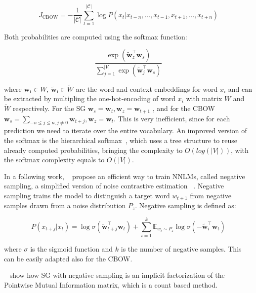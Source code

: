 \begin{equation}
J_{\mathrm{CBOW}}=-\frac{1}{|\mathcal{C}|} \sum_{t=1}^{|\mathcal{C}|} \log P\left(x_{t} | x_{t-n}, \dots, x_{t-1}, x_{t+1}, \dots, x_{t+n}\right)
\end{equation}

Both probabilities are computed using the softmax function:

\begin{equation}
\frac{\exp \left(\tilde{\mathbf{w}}_{z}^{\top} \mathbf{w}_{s}\right)}{\sum_{j=1}^{|V|} \exp \left(\tilde{\mathbf{w}}_{j}^{\top} \mathbf{w}_{s}\right)}
\end{equation}

where $\mathbf{w_i} \in W$, $\mathbf{\tilde{w}_i} \in \tilde{W}$ are the word and context embeddings for word $x_i$ and can be extracted by multipling the one-hot-encoding of word $x_i$ with matrix $W$ and $\tilde{W}$ respectively. For the SG $\mathbf{w}_s = \mathbf{w}_t, \mathbf{w}_z = \mathbf{w}_{t+1}$ , and for the CBOW $\mathbf{w}_s = \sum_{-n \leq j \leq n, j \neq 0} \mathbf{w}_{t+j}, \mathbf{w}_z = \mathbf{w}_{t}$.  This is very inefficient, since for each prediction we need to iterate over the entire vocabulary. An improved version of the softmax is the hierarchical softmax~\citep{Morin05hierarchicalprobabilistic}, which uses a tree structure to reuse already computed probabilities, bringing the complexity to $O(log(|V|))$, with the softmax complexity equals to $O(|V|)$.

In a following work, ~\cite{mikolov2013distributed} propose an efficient way to train NNLMs, called negative sampling, a simplified version of noise contrastive estimation ~\citep{gutmann2012contrastive}. Negative sampling trains the model to distinguish
a target word $w_{t+1}$ from negative samples drawn from a noise distribution $P_z$. Negative sampling is defined as:

\begin{equation}
P\left(x_{t+j} | x_{t}\right)=\log \sigma\left(\tilde{\mathbf{w}}_{t+j}^{\top} \mathbf{w}_{t}\right)+\sum_{i=1}^{k} \mathbb{E}_{w_{i} \sim P_{z}} \log \sigma\left(-\tilde{\mathbf{w}}_{i}^{\top} \mathbf{w}_{t}\right)
\label{eq:neg_samp}
\end{equation}

where $\sigma$ is the sigmoid function and $k$ is the number of negative samples. This can be easily adapted also for the CBOW.

~\cite{levy2014embedding_pmi} show how SG with negative sampling is an implicit factorization of the Pointwise Mutual Information matrix, which is a count based        method.

